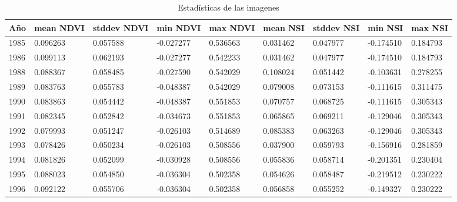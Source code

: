 
\begin{table}[!ht]
    \centering
    
    \caption{Estadísticas de las imagenes}
    \tiny
    \begin{tabularx}{\textwidth}{XXXXXXXXX}
    \toprule
    \textbf{Año} &  \textbf{mean} \newline \textbf{NDVI} &  \textbf{stddev} \newline \textbf{NDVI} &  \textbf{min} \newline \textbf{NDVI} &  \textbf{max} \newline \textbf{NDVI} &  \textbf{mean} \newline \textbf{NSI} &  \textbf{stddev} \newline \textbf{NSI} &  \textbf{min} \newline \textbf{NSI} &  \textbf{max} \newline \textbf{NSI} \\
    \midrule
    1985 &   0.096263 &     0.057588 & -0.027277 &  0.536563 &  0.031462 &    0.047977 & -0.174510 & 0.184793 \\
    1986 &   0.099113 &     0.062193 & -0.027277 &  0.542233 &  0.031462 &    0.047977 & -0.174510 & 0.184793 \\
    1988 &   0.088367 &     0.058485 & -0.027590 &  0.542029 &  0.108024 &    0.051442 & -0.103631 & 0.278255 \\
    1989 &   0.083763 &     0.055783 & -0.048387 &  0.542029 &  0.079008 &    0.073153 & -0.111615 & 0.311475 \\
    1990 &   0.083863 &     0.054442 & -0.048387 &  0.551853 &  0.070757 &    0.068725 & -0.111615 & 0.305343 \\
    1991 &   0.082345 &     0.052842 & -0.034673 &  0.551853 &  0.065865 &    0.069211 & -0.129046 & 0.305343 \\
    1992 &   0.079993 &     0.051247 & -0.026103 &  0.514689 &  0.085383 &    0.063263 & -0.129046 & 0.305343 \\
    1993 &   0.078426 &     0.050234 & -0.026103 &  0.508556 &  0.037900 &    0.059793 & -0.156916 & 0.281859 \\
    1994 &   0.081826 &     0.052099 & -0.030928 &  0.508556 &  0.055836 &    0.058714 & -0.201351 & 0.230404 \\
    1995 &   0.088023 &     0.054850 & -0.036304 &  0.502358 &  0.054626 &    0.058487 & -0.219512 & 0.230222 \\
    1996 &   0.092122 &     0.055706 & -0.036304 &  0.502358 &  0.056858 &    0.055252 & -0.149327 & 0.230222 \\

\end{tabularx}
\end{table}
